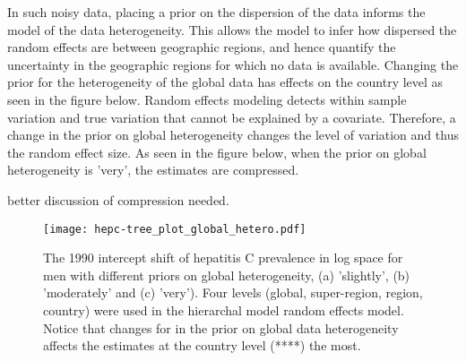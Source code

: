 In such noisy data, placing a prior on the dispersion of the data informs the model of the data heterogeneity.  This allows the model to infer how dispersed the random effects are between geographic regions, and hence quantify the uncertainty in the geographic regions for which no data is available.  Changing the prior for the heterogeneity of the global data has effects on the country level as seen in the figure below.  Random effects modeling detects within sample variation and true variation that cannot be explained by a covariate.  Therefore, a change in the prior on global heterogeneity changes the level of variation and thus the random effect size.  As seen in the figure below, when the prior on global heterogeneity is 'very', the estimates are compressed.

better discussion of compression needed.

    \begin{figure}[h]
        \begin{center}
            \texttt{[image: hepc-tree\_plot\_global\_hetero.pdf]}
            \caption{The 1990 intercept shift of hepatitis C prevalence  in log space for men with different priors on global heterogeneity, (a) 'slightly', (b) 'moderately' and (c) 'very').  Four levels (global, super-region, region, country) were used in the hierarchal model random effects model.  Notice that changes for in the prior on global data heterogeneity affects the estimates at the country level (****) the most.}
            \label{fig:app-hepc global hetero}
        \end{center}
    \end{figure}
